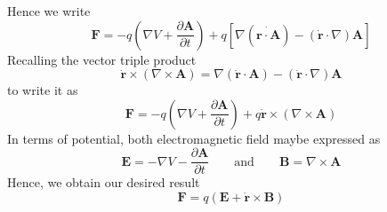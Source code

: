 \documentclass[../../../main.tex]{subfiles}
\begin{document}
Hence we write
\begin{equation*}
	\mathbf{F }=-q \left( \nabla  V+\frac{\partial \mathbf{A }}{\partial t} \right) +q \left[ \nabla \left( \dot{\mathbf{r }\cdot \mathbf{A }} \right)-\left( \dot{\mathbf{r}}\cdot \nabla   \right)\mathbf{A}   \right] 
\end{equation*}
Recalling the vector triple product
\begin{equation*}
	\dot{\mathbf{r }}\times \left( \nabla \times \mathbf{A }  \right)=\nabla \left( \dot{\mathbf{r }}\cdot \mathbf{A} \right)  -\left( \dot{\mathbf{r }}\cdot \nabla   \right) \mathbf{A}
\end{equation*}
to write it as 
\begin{equation*}
	\mathbf{F }=-q \left( \nabla V+\frac{\partial \mathbf{A }}{\partial t } \right) +q \dot{\mathbf{r }}\times \left( \nabla \times \mathbf{A} \right) 
\end{equation*}
In terms of potential, both electromagnetic field maybe expressed as
\begin{equation*}
	\mathbf{E}=-\nabla V-\frac{\partial \mathbf{A }}{\partial t}\qquad \text{and}\qquad \mathbf{B} =\nabla \times \mathbf{A}
\end{equation*} 
Hence, we obtain our desired result
\begin{equation*}
	\mathbf{F}=q \left( \mathbf{E}+\dot{\mathbf{r}}\times \mathbf{B} \right) 
\end{equation*}
\end{document}
